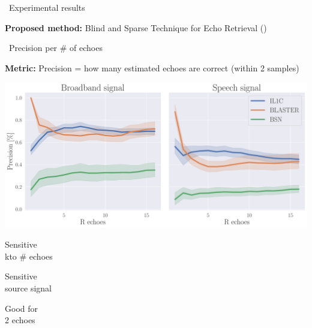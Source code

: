 \begin{frame}{\faFlask~Experimental results \hfill\faJediOrder}
    \vfill
    \begin{mycontriblock}
        \textbf{Proposed method:} Blind and Sparse Technique for Echo Retrieval (\blaster)
    \end{mycontriblock}


\end{frame}


\begin{frame}{\faFlask~Precision per \# of echoes \hfill\faJediOrder}

    \textbf{Metric:} \alert{Precision} = how many estimated echoes are correct (within 2 samples)

    \begin{center}
        \includegraphics[width=0.8\linewidth]{figures/p_k-7_thr-2_bns_crocco_blaster-peak_withRechoes.pdf}
        \\
    \end{center}

    \begin{center}
        \textcolor{myred}{\xmark \: \parbox{8em}{Sensitive\\kto \# echoes}}
        \quad\textcolor{myred}{\xmark \: \parbox{8em}{Sensitive\\source signal}}
        \quad\textcolor{mygreen}{\cmark \: \parbox{8em}{Good for\\2 echoes}}
    \end{center}


\end{frame}

